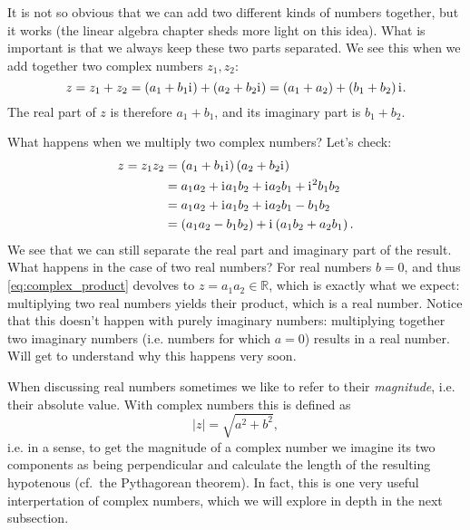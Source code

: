 It is not so obvious that we can add two different kinds of numbers together, but it works (the linear algebra chapter sheds more light on this idea). What is important is that we always keep these two parts separated. We see this when we add together two complex numbers $z_{1},z_{2}$:
\begin{equation}
	z = z_{1}+z_{2} = \left( a_{1}+b_{1}\mathrm{i}\mkern1mu \right) + \left( a_{2}+b_{2}\mathrm{i}\mkern1mu \right) = \left( a_{1}+a_{2} \right) + \left( b_{1}+b_{2} \right)\mathrm{i}\mkern1mu.
	\label{eq:complex_addition}
\end{equation}
The real part of $z$ is therefore $a_{1}+b_{1}$, and its imaginary part is $b_{1}+b_{2}$.

What happens when we multiply two complex numbers? Let's check:
\begin{align}
	z = z_{1}z_{2} &= \left( a_{1}+b_{1}\mathrm{i}\mkern1mu \right)\left( a_{2}+b_{2}\mathrm{i}\mkern1mu \right)\nonumber\\
	&= a_{1}a_{2} + \mathrm{i}\mkern1mu a_{1}b_{2} + \mathrm{i}\mkern1mu a_{2}b_{1} + \mathrm{i}\mkern1mu^{2}b_{1}b_{2}\nonumber\\
	&= a_{1}a_{2} + \mathrm{i}\mkern1mu a_{1}b_{2} + \mathrm{i}\mkern1mu a_{2}b_{1} - b_{1}b_{2}\nonumber\\
	&= \left( a_{1}a_{2} - b_{1}b_{2} \right) + \mathrm{i}\mkern1mu\left( a_{1}b_{2} + a_{2}b_{1} \right).
	\label{eq:complex_product}
\end{align}
We see that we can still separate the real part and imaginary part of the result. What happens in the case of two real numbers? For real numbers $b=0$, and thus \autoref{eq:complex_product} devolves to $z=a_{1}a_{2}\in\mathbb{R}$, which is exactly what we expect: multiplying two real numbers yields their product, which is a real number. Notice that this doesn't happen with purely imaginary numbers: multiplying together two imaginary numbers (i.e. numbers for which $a=0$) results in a real number. Will get to understand why this happens very soon.

When discussing real numbers sometimes we like to refer to their \textit{magnitude}, i.e. their absolute value. With complex numbers this is defined as
\begin{equation}
	|z| = \sqrt{a^{2}+b^{2}},
	\label{eq:complex_magnitude}
\end{equation}
i.e. in a sense, to get the magnitude of a complex number we imagine its two components as being perpendicular and calculate the length of the resulting hypotenous (cf.\ the Pythagorean theorem). In fact, this is one very useful interpertation of complex numbers, which we will explore in depth in the next subsection.

